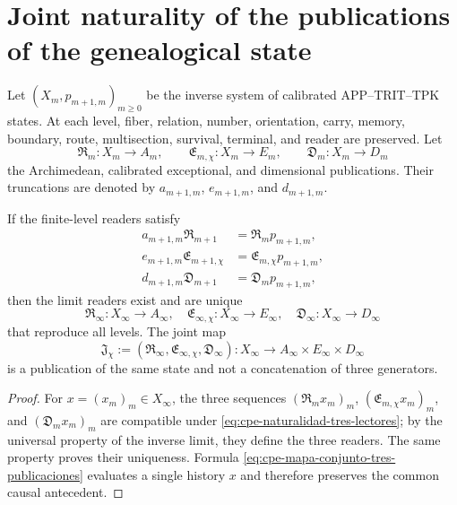\section{Joint naturality of the publications of the genealogical state}
\label{sec:cpe-naturalidad-tres-publicaciones}

Let \((X_m,p_{m+1,m})_{m\ge0}\) be the inverse system of calibrated
APP--TRIT--TPK states. At each level, fiber, relation,
number, orientation, carry, memory, boundary, route, multisection,
survival, terminal, and reader are preserved. Let
\[
 \mathfrak R_m:X_m\to A_m,
 \qquad
 \mathfrak E_{m,\chi}:X_m\to E_m,
 \qquad
 \mathfrak D_m:X_m\to D_m
\]
the Archimedean, calibrated exceptional, and dimensional publications. Their
truncations are denoted by \(a_{m+1,m}\), \(e_{m+1,m}\), and
\(d_{m+1,m}\).

\begin{theorem}
\label{thm:cpe-cono-tres-publicaciones}
If the finite-level readers satisfy
\begin{equation}
\begin{aligned}
 a_{m+1,m}\mathfrak R_{m+1}&=\mathfrak R_mp_{m+1,m},\\
 e_{m+1,m}\mathfrak E_{m+1,\chi}&=\mathfrak E_{m,\chi}p_{m+1,m},\\
 d_{m+1,m}\mathfrak D_{m+1}&=\mathfrak D_mp_{m+1,m},
\end{aligned}
\label{eq:cpe-naturalidad-tres-lectores}
\end{equation}
then the limit readers exist and are unique
\[
 \mathfrak R_\infty:X_\infty\to A_\infty,
 \quad
 \mathfrak E_{\infty,\chi}:X_\infty\to E_\infty,
 \quad
 \mathfrak D_\infty:X_\infty\to D_\infty
\]
that reproduce all levels. The joint map
\begin{equation}
 \mathfrak J_\chi
 :=(\mathfrak R_\infty,\mathfrak E_{\infty,\chi},\mathfrak D_\infty)
 :X_\infty\longrightarrow A_\infty\times E_\infty\times D_\infty
 \label{eq:cpe-mapa-conjunto-tres-publicaciones}
\end{equation}
is a publication of the same state and not a concatenation of three generators.
\end{theorem}

\begin{proof}
For \(x=(x_m)_m\in X_\infty\), the three sequences
\((\mathfrak R_mx_m)_m\), \((\mathfrak E_{m,\chi}x_m)_m\), and
\((\mathfrak D_mx_m)_m\) are compatible under
\eqref{eq:cpe-naturalidad-tres-lectores}; by the universal property
of the inverse limit, they define the three readers. The same property proves their uniqueness.
Formula \eqref{eq:cpe-mapa-conjunto-tres-publicaciones} evaluates a single
history \(x\) and therefore preserves the common causal antecedent.
\end{proof}

